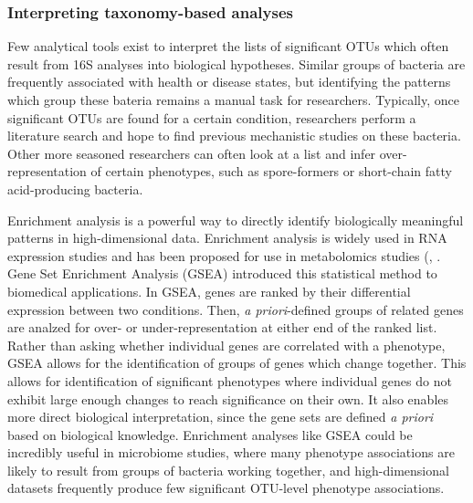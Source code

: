 \documentclass[12pt]{article}
\begin{document}
\subsubsection{Interpreting taxonomy-based analyses}\label{sec:gsea}
Few analytical tools exist to interpret the lists of
significant OTUs which often result from 16S analyses into biological hypotheses. 
Similar groups of bacteria are frequently associated with health or 
disease states, but identifying the patterns which group these bateria 
remains a manual task for researchers. 
Typically, once significant OTUs are found for a certain condition,
researchers perform a literature search and hope to find 
previous mechanistic studies on these bacteria.
Other more seasoned researchers can often look at a list and infer
over-representation of certain phenotypes, such as spore-formers
or short-chain fatty acid-producing bacteria.

Enrichment analysis is a powerful way to directly identify biologically 
meaningful patterns in high-dimensional data. Enrichment analysis is 
widely used in RNA expression studies and has been proposed for use in 
metabolomics studies (\cite{subramanian-gsea-2005}, 
\cite{xia-msea-2010}. Gene Set Enrichment Analysis (GSEA) introduced
this statistical method to biomedical applications. In GSEA, genes are 
ranked by their differential expression between two conditions. Then, 
\textit{a priori}-defined groups of related genes are analzed for 
over- or under-representation at either end of the ranked list. Rather 
than asking whether individual genes are correlated with a phenotype, 
GSEA allows for the identification of groups of genes which change 
together. This allows for identification of significant phenotypes 
where individual genes do not exhibit large enough changes to reach 
significance on their own. It also enables more direct biological 
interpretation, since the gene sets are defined \textit{a priori} 
based on biological knowledge. Enrichment analyses like GSEA
could be incredibly useful in microbiome studies, where 
many phenotype associations are likely to result from groups of
bacteria working together, and high-dimensional datasets
frequently produce few significant OTU-level phenotype associations.
\end{document}

